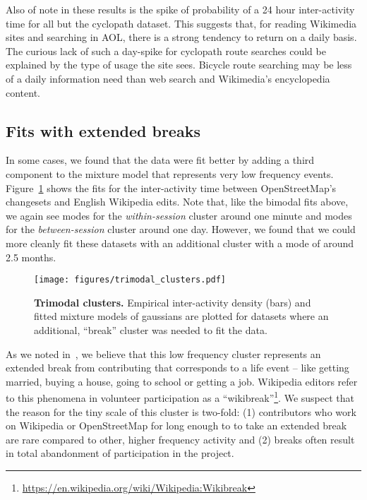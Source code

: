 Also of note in these results is the spike of probability of a 24 hour inter-activity time for all but the cyclopath dataset.  This suggests that, for reading Wikimedia sites and searching in AOL, there is a strong tendency to return on a daily basis.  The curious lack of such a day-spike for cyclopath route searches could be explained by the type of usage the site sees. Bicycle route searching may be less of a daily information need than web search and Wikimedia's encyclopedia content.

\subsection{Fits with extended breaks}

In some cases, we found that the data were fit better by adding a third component to the mixture model that represents very low frequency events.  Figure~\ref{fig:trimodal_clusters} shows the fits for the inter-activity time between OpenStreetMap's changesets and English Wikipedia edits.  Note that, like the bimodal fits above, we again see modes for the \emph{within-session} cluster around one minute and modes for the \emph{between-session} cluster around one day.  However, we found that we could more cleanly fit these datasets with an additional cluster with a mode of around 2.5 months.

\begin{figure}
\centering
\texttt{[image: figures/trimodal\_clusters.pdf]}
\caption{
    \textbf{Trimodal clusters.} Empirical inter-activity density (bars) and fitted mixture models of gaussians are plotted for datasets where an additional, ``break'' cluster was needed to fit the data.
}
\label{fig:trimodal_clusters}
\end{figure}

As we noted in~\cite{geiger2013using}, we believe that this low frequency cluster represents an extended break from contributing that corresponds to a life event -- like getting married, buying a house, going to school or getting a job.  Wikipedia editors refer to this phenomena in volunteer participation as a ``wikibreak''\footnote{\url{https://en.wikipedia.org/wiki/Wikipedia:Wikibreak}}.  We suspect that the reason for the tiny scale of this cluster is two-fold: (1) contributors who work on Wikipedia or OpenStreetMap for long enough to to take an extended break are rare compared to other, higher frequency activity and (2) breaks often result in total abandonment of participation in the project.

